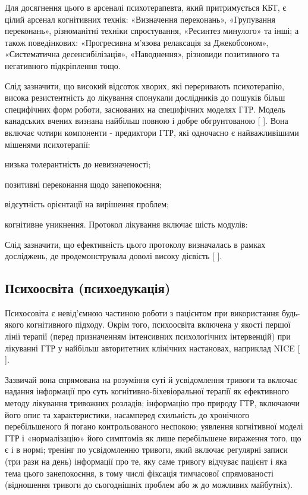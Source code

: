 Для досягнення цього в арсеналі психотерапевта, який притримується КБТ, є цілий арсенал когнітивних технік: «Визначення переконань», «Групування переконань», різноманітні техніки спростування, «Ресинтез минулого» та інші; а також поведінкових: «Прогресивна м'язова релаксація за Джекобсоном», «Систематична десенсибілізація», «Наводнення», різновиди позитивного та негативного підкріплення тощо. 

Слід зазначити, що високий відсоток хворих, які переривають психотерапію, висока резистентність до лікування спонукали дослідників до пошуків більш специфічних форм роботи, заснованих на специфічних моделях ГТР. Модель канадських вчених визнана найбільш повною і добре обгрунтованою [
\cite{bib11}]. Вона включає чотири компоненти - предиктори ГТР, які одночасно є найважливішими мішенями психотерапії:

\item низька толерантність до невизначеності;
\item позитивні переконання щодо занепокоєння;
\item відсутність орієнтації на вирішення проблем;
\item когнітивне уникнення.
Протокол лікування включає шість модулів: 

Слід зазначити, що ефективність цього протоколу визначалась в рамках досліджень, де продемонструвала доволі високу дієвість [
\cite{bib15}].

\subsection {Психоосвіта (психоедукація)}
Психосовіта є невід’ємною частиною роботи з пацієнтом при використання будь-якого когнітивного підходу. Окрім того, психоосвіта включена у якості першої лінії терапії (перед призначенням інтенсивних психологічних інтервенцій) при лікуванні ГТР у найбільш авторитетних клінічних настановах, наприклад NICE [
\cite{bib16}].

Зазвичай вона спрямована на розуміння суті й усвідомлення тривоги та включає надання інформації про суть когнітивно-біхевіоральної терапії як ефективного методу лікування тривожних розладів; інформацію про природу ГТР, включаючи його опис та характеристики, насамперед схильність до хронічного перебільшеного й погано контрольованого неспокою; уявлення когнітивної моделі ГТР і «нормалізацію» його симптомів як лише перебільшене вираження того, що є і в нормі; тренінг по усвідомленню тривоги, який включає регулярні записи (три рази на день) інформації про те, яку саме тривогу відчуває пацієнт і яка тема цього занепокоєння, в тому числі фіксація тимчасової спрямованості (відношення тривоги до сьогоднішніх проблем або ж до можливих майбутніх).

